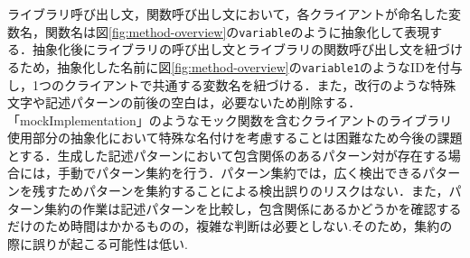 \documentclass[T,J]{fose} %
\begin{document}
\begin{table}[t]
\caption{記述パターンの作成例}
\label{table:abstractionsample}
\end{table}


ライブラリ呼び出し文，関数呼び出し文において，各クライアントが命名した変数名，関数名は図\ref{fig:method-overview}の\texttt{variable}のように抽象化して表現する．抽象化後にライブラリの呼び出し文とライブラリの関数呼び出し文を紐づけるため，抽象化した名前に図\ref{fig:method-overview}の\texttt{variable1}のようなIDを付与し，1つのクライアントで共通する変数名を紐づける．また，改行のような特殊文字や記述パターンの前後の空白は，必要ないため削除する．「mockImplementation」のようなモック関数を含むクライアントのライブラリ使用部分の抽象化において特殊な名付けを考慮することは困難なため今後の課題とする．生成した記述パターンにおいて包含関係のあるパターン対が存在する場合には，手動でパターン集約を行う．パターン集約では，広く検出できるパターンを残すためパターンを集約することによる検出誤りのリスクはない．また，パターン集約の作業は記述パターンを比較し，包含関係にあるかどうかを確認するだけのため時間はかかるものの，複雑な判断は必要としない.そのため，集約の際に誤りが起こる可能性は低い.
\end{document}
